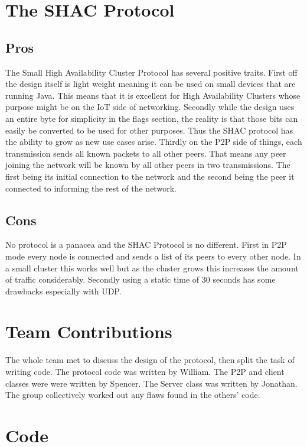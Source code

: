 \documentclass[11pt]{article}
\begin{document}
\begin{doublespace}
\section{The SHAC Protocol}

\subsection{Pros}
The Small High Availability Cluster Protocol has several positive traits. First off the design itself is light weight meaning it can be used on small devices that are running Java. This means that it is excellent for High Availability Clusters whose purpose might be on the IoT side of networking. Secondly while the design uses an entire byte for simplicity in the flags section, the reality is that those bits can easily be converted to be used for other purposes. Thus the SHAC protocol has the ability to grow as new use cases arise. Thirdly on the P2P side of things, each transmission sends all known packets to all other peers. That means any peer joining the network will be known by all other peers in two transmissions. The first being its initial connection to the network and the second being the peer it connected to informing the rest of the network.

\subsection{Cons} 
No protocol is a panacea and the SHAC Protocol is no different. First in P2P mode every node is connected and sends a list of its peers to every other node. In a small cluster this works well but as the cluster grows this increases the amount of traffic considerably. Secondly using a static time of 30 seconds has some drawbacks especially with UDP. 

\section{Team Contributions}

The whole team met to discuss the design of the protocol, then split the task of writing code.
The protocol code was written by William.
The P2P and client classes were were written by Spencer.
The Server class was written by Jonathan.
The group collectively worked out any flaws found in the others' code.

\section{Code}
\end{doublespace}
\end{document}
